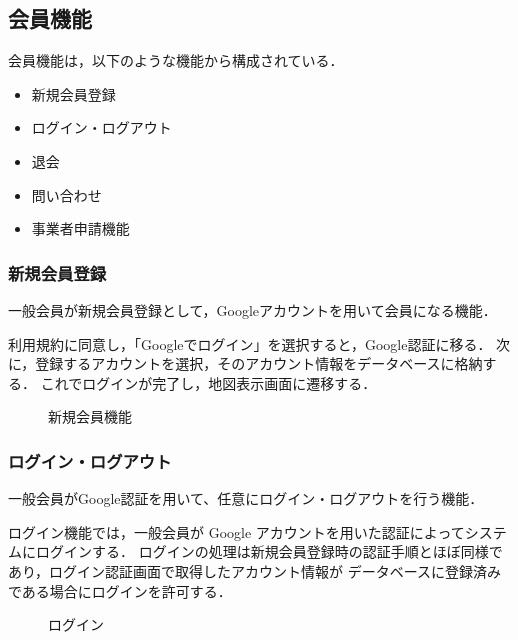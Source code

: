 \subsection{会員機能}
会員機能は，以下のような機能から構成されている．

\begin{itemize}
    \item 新規会員登録
    \item ログイン・ログアウト
    \item 退会
    \item 問い合わせ
    \item 事業者申請機能
\end{itemize}


\subsubsection{新規会員登録}

一般会員が新規会員登録として，Googleアカウントを用いて会員になる機能．

利用規約に同意し，「Googleでログイン」を選択すると，Google認証に移る．
次に，登録するアカウントを選択，そのアカウント情報をデータベースに格納する．
これでログインが完了し，地図表示画面に遷移する．


\begin{figure}[H]
    \centering
    
    \caption{新規会員機能}
\end{figure}

\subsubsection{ログイン・ログアウト}
一般会員がGoogle認証を用いて、任意にログイン・ログアウトを行う機能．

ログイン機能では，一般会員が Google アカウントを用いた認証によってシステムにログインする．
ログインの処理は新規会員登録時の認証手順とほぼ同様であり，ログイン認証画面で取得したアカウント情報が
データベースに登録済みである場合にログインを許可する．

\begin{figure}[H]
    \centering
    
    \caption{ログイン}
\end{figure}

